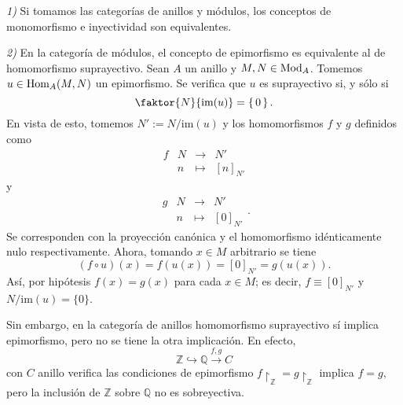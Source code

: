 \documentclass[../main.tex]{subfiles}
\begin{document}
\begin{remark}
\textit{1)} Si tomamos las categorías de anillos y módulos, los conceptos de monomorfismo e inyectividad son equivalentes.

\textit{2)} En la categoría de módulos, el concepto de epimorfismo es equivalente al de homomorfismo suprayectivo. Sean $A$ un anillo y $M,N\in\text{Mod}_A$. Tomemos $u\in\text{Hom}_A(M,N)$ un epimorfismo. Se verifica que $u$ es suprayectivo si, y sólo si $$\faktor{N}{\text{im}(u)}=\set{0}.$$
En vista de esto, tomemos $N':=N/\text{im}(u)$ y los homomorfismos $f$ y $g$ definidos como
$$\begin{array}{rrcl}
f&N&\longrightarrow&N'\\
&n&\longmapsto&[n]_{N'} 
\end{array}$$
y
$$\begin{array}{rrcl}
g&N&\longrightarrow&N'\\
&n&\longmapsto&[0]_{N'} 
\end{array}.$$
Se corresponden con la proyección canónica y el homomorfismo idénticamente nulo respectivamente. Ahora, tomando $x\in M$ arbitrario se tiene
$$(f\circ u)(x)=f(u(x))=[0]_{N'}=g(u(x)).$$
Así, por hipótesis $f(x)=g(x)$ para cada $x\in M$; es decir, $f\equiv[0]_{N'}$ y $N/\text{im}(u)=\{0\}$.

Sin embargo, en la categoría de anillos homomorfismo suprayectivo sí implica epimorfismo, pero no se tiene la otra implicación. En efecto, $$\mathbb{Z}\hookrightarrow \mathbb{Q}\overset{f,g}{\longrightarrow}C$$con $C$ anillo verifica las condiciones de epimorfismo $f\restriction_{\mathbb{Z}}= g\restriction_{\mathbb{Z}}$ implica $f=g$, pero la inclusión de $\mathbb{Z}$ sobre $\mathbb{Q}$ no es sobreyectiva.
\end{remark}
\end{document}
